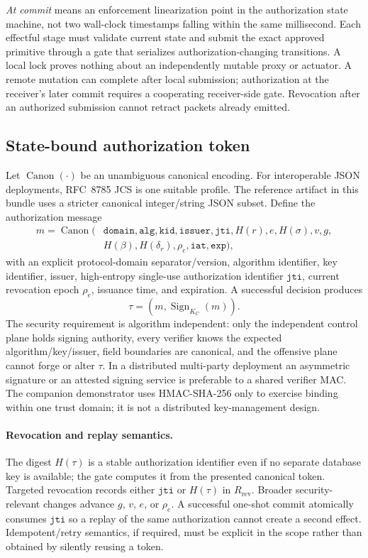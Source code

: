 \documentclass[11pt,letterpaper]{article}
\begin{document}
\emph{At commit} means an enforcement linearization point in the authorization state machine, not two wall-clock timestamps falling within the same millisecond. Each effectful stage must validate current state and submit the exact approved primitive through a gate that serializes authorization-changing transitions. A local lock proves nothing about an independently mutable proxy or actuator. A remote mutation can complete after local submission; authorization at the receiver's later commit requires a cooperating receiver-side gate. Revocation after an authorized submission cannot retract packets already emitted.

\subsection{State-bound authorization token}
Let $\operatorname{Canon}(\cdot)$ be an unambiguous canonical encoding. For interoperable JSON deployments, RFC~8785 JCS is one suitable profile.\cite{rfc8785} The reference artifact in this bundle uses a stricter canonical integer/string JSON subset. Define the authorization message
\[
\begin{aligned}
m=\operatorname{Canon}(&\texttt{domain},\texttt{alg},\texttt{kid},\texttt{issuer},\texttt{jti},H(r),e,H(\sigma),v,g,\\
& H(\beta),H(\delta_r),\rho_e,\texttt{iat},\texttt{exp}),
\end{aligned}
\]
with an explicit protocol-domain separator/version, algorithm identifier, key identifier, issuer, high-entropy single-use authorization identifier $\texttt{jti}$, current revocation epoch $\rho_e$, issuance time, and expiration. A successful decision produces
\[
\tau=(m,\operatorname{Sign}_{K_C}(m)).
\]
The security requirement is algorithm independent: only the independent control plane holds signing authority, every verifier knows the expected algorithm/key/issuer, field boundaries are canonical, and the offensive plane cannot forge or alter $\tau$. In a distributed multi-party deployment an asymmetric signature or an attested signing service is preferable to a shared verifier MAC. The companion demonstrator uses HMAC-SHA-256 only to exercise binding within one trust domain; it is not a distributed key-management design.

\paragraph{Revocation and replay semantics.} The digest $H(\tau)$ is a stable authorization identifier even if no separate database key is available; the gate computes it from the presented canonical token. Targeted revocation records either $\texttt{jti}$ or $H(\tau)$ in $R_{\mathrm{rev}}$. Broader security-relevant changes advance $g$, $v$, $e$, or $\rho_e$. A successful one-shot commit atomically consumes $\texttt{jti}$ so a replay of the same authorization cannot create a second effect. Idempotent/retry semantics, if required, must be explicit in the scope rather than obtained by silently reusing a token.
\end{document}
